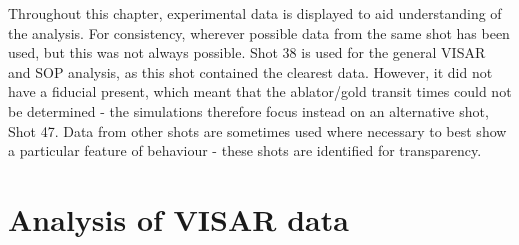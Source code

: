 Throughout this chapter, experimental data is displayed to aid understanding of the analysis. For consistency, wherever possible data from the same shot has been used, but this was not always possible. Shot 38 is used for the general VISAR and SOP analysis, as this shot contained the clearest data. However, it did not have a fiducial present, which meant that the ablator/gold transit times could not be determined - the simulations therefore focus instead on an alternative shot, Shot 47. Data from other shots are sometimes used where necessary to best show a particular feature of behaviour - these shots are identified for transparency.


\section{Analysis of VISAR data} \label{VISAR analysis}


